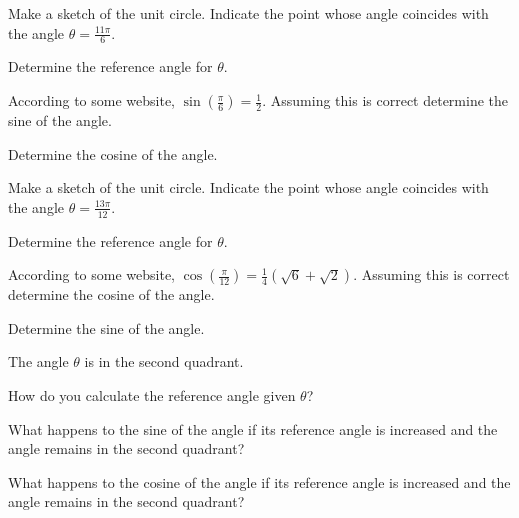 \begin{problem}
\item Make a sketch of the unit circle. Indicate the point whose angle
  coincides with the angle $\theta=\frac{11\pi}{6}$.
  \begin{subproblem}
    \item Determine the reference angle for $\theta$.
      \vfill
    \item According to some website,
    $\displaystyle{\sin\left(\frac{\pi}{6}\right)=\frac{1}{2}}$.
    Assuming this is correct determine the sine of the angle.
      \vfill
    \item Determine the cosine of the angle.
      \vfill
  \end{subproblem}

  \clearpage

  \item Make a sketch of the unit circle. Indicate the point whose angle
    coincides with the angle $\theta=\frac{13\pi}{12}$.
    \begin{subproblem}
      \item Determine the reference angle for $\theta$.
        \vfill
      \item According to some website,
      $\displaystyle{\cos\left(\frac{\pi}{12}\right)=\frac{1}{4}\left( \sqrt{6} + \sqrt{2}\right)}$.
      Assuming this is correct determine the cosine of the angle.
        \vfill
      \item Determine the sine of the angle.
        \vfill
    \end{subproblem}

    \clearpage

  \item The angle $\theta$ is in the second quadrant.
  \begin{subproblem}
    \item How do you calculate the reference angle given $\theta$?
      \vfill
    \item What happens to the sine of the angle if its reference angle is
      increased and the angle remains in the second quadrant?
      \vfill
    \item What happens to the cosine of the angle if its reference angle is
      increased and the angle remains in the second quadrant?
      \vfill
  \end{subproblem}

  \clearpage


\end{problem}
